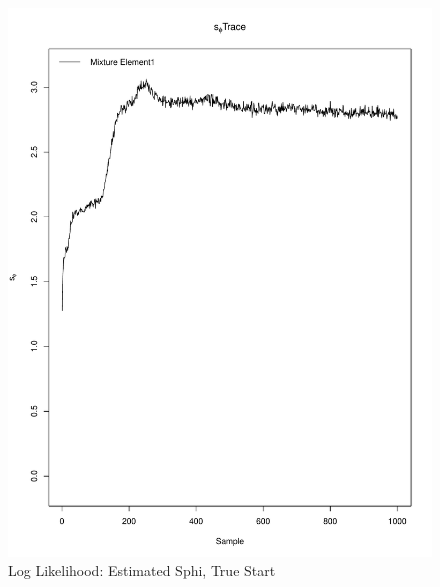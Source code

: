 \documentclass[11pt]{labbook}
\begin{document}
     \begin{figure}
        \centering
        \includegraphics[scale=.65]{FONSE_Plots/2016/November_9/estSphi_sim_sphi}
        \caption{Log Likelihood: Estimated Sphi, True Start}
        \label{fig:NOV9_E.S.SPHI}
    \end{figure}
\end{document}
